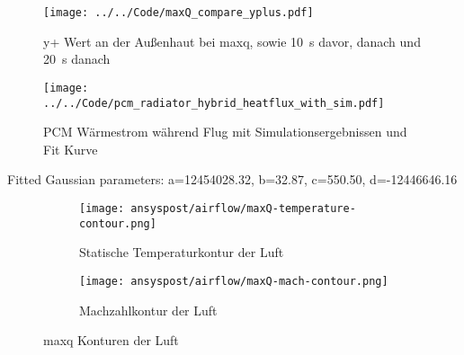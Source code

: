 \begin{figure}[H]
  \centering
  \texttt{[image: ../../Code/maxQ\_compare\_yplus.pdf]}
  \caption{y+ Wert an der Außenhaut bei \ac{maxq}, sowie \SI{10}{s} davor, danach und \SI{20}{s} danach}\label{fig:yplus_maxQ_simulationen}
\end{figure}

\begin{figure}[H]
  \centering
  \texttt{[image: ../../Code/pcm\_radiator\_hybrid\_heatflux\_with\_sim.pdf]}
  \caption{PCM Wärmestrom während Flug mit Simulationsergebnissen und Fit Kurve}\label{fig:pcm_waermestrom_sim}
\end{figure}

Fitted Gaussian parameters:
a=12454028.32, b=32.87, c=550.50, d=-12446646.16

\begin{figure}[H]
    \centering

    \begin{subfigure}{\textwidth}
        \centering
        \texttt{[image: ansyspost/airflow/maxQ-temperature-contour.png]}
        \caption{Statische Temperaturkontur der Luft}
        \label{fig:maxQ_temp_contour}
    \end{subfigure}

    \begin{subfigure}{\textwidth}
        \centering
        \texttt{[image: ansyspost/airflow/maxQ-mach-contour.png]}
        \caption{Machzahlkontur der Luft}
        \label{fig:maxQ_mach_contour}
    \end{subfigure}

    \caption{\texorpdfstring{\ac{maxq}}{max Q} Konturen der Luft}
    \label{fig:maxQ_konturen}
\end{figure}